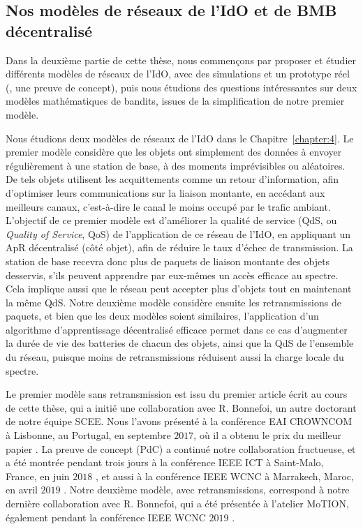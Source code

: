 \begin{resume_fr}
\subsection*{Nos modèles de réseaux de l'IdO et de BMB décentralisé}

Dans la deuxième partie de cette thèse, nous commençons par proposer et étudier différents modèles de réseaux de l'IdO, avec des simulations et un prototype réel (\ie, une preuve de concept), puis nous étudions des questions intéressantes sur deux modèles mathématiques de bandits, issues de la simplification de notre premier modèle.


%
Nous étudions deux modèles de réseaux de l'IdO dans le Chapitre~\ref{chapter:4}.
Le premier modèle considère que les objets ont simplement des données à envoyer régulièrement à une station de base, à des moments imprévisibles ou aléatoires.
De tels objets utilisent les acquittements comme un retour d'information, afin d'optimiser leurs communications sur la liaison montante, en accédant aux meilleurs canaux, c'est-à-dire le canal le moins occupé par le trafic ambiant.
L'objectif de ce premier modèle est d'améliorer la qualité de service (QdS, ou \emph{Quality of Service}, QoS) de l'application de ce réseau de l'IdO, en appliquant un ApR décentralisé (côté objet), afin de réduire le taux d'échec de transmission.
La station de base recevra donc plus de paquets de liaison montante des objets desservis, s'ils peuvent apprendre par eux-mêmes un accès efficace au spectre.
Cela implique aussi que le réseau peut accepter plus d'objets tout en maintenant la même QdS.
%
Notre deuxième modèle considère ensuite les retransmissions de paquets, et bien que les deux modèles soient similaires, l'application d'un algorithme d'apprentissage décentralisé efficace permet dans ce cas d'augmenter la durée de vie des batteries de chacun des objets, ainsi que la QdS de l'ensemble du réseau, puisque moins de retransmissions réduisent aussi la charge locale du spectre.

Le premier modèle sans retransmission est issu du premier article écrit au cours de cette thèse, qui a initié une collaboration avec R. Bonnefoi, un autre doctorant de notre équipe SCEE.
Nous l'avons présenté à la conférence EAI CROWNCOM à Lisbonne, au Portugal, en septembre $2017$, où il a obtenu le \guillemotleft{} prix du meilleur papier \guillemotright{} \cite{Bonnefoi17}.
%
La preuve de concept (PdC) a continué notre collaboration fructueuse, et a été montrée pendant trois jours à la conférence IEEE ICT à Saint-Malo, France, en juin $2018$ \cite{Besson2018ICT}, et aussi à la conférence IEEE WCNC à Marrakech, Maroc, en avril $2019$ \cite{Besson2019WCNC}.
%
Notre deuxième modèle, avec retransmissions, correspond à notre dernière collaboration avec R. Bonnefoi, qui a été présentée à l'atelier MoTION, également pendant la conférence IEEE WCNC $2019$ \cite{Bonnefoi2019WCNC}.



\end{resume_fr}
